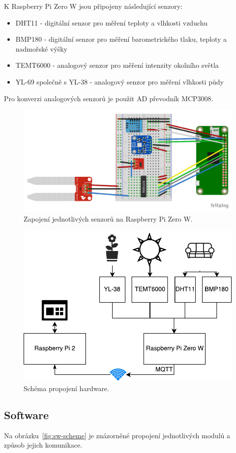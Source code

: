 \documentclass[11pt,a4paper]{article}
\begin{document}
K Raspberry Pi Zero W jsou připojeny následující senzory:

\begin{itemize}
    \item DHT11 - digitální senzor pro měření teploty a vlhkosti vzduchu
    \item BMP180 - digitální senzor pro měření barometrického tlaku, teploty a nadmořské výšky
    \item TEMT6000 - analogový senzor pro měření intenzity okolního světla
    \item YL-69 společně s YL-38 - analogový senzor pro měření vlhkosti půdy
\end{itemize}

Pro konverzi analogových senzorů je použit AD převodník MCP3008.

\begin{figure}[htb]
    \centering
    \includegraphics[width=0.75\linewidth]{weather-station_bb}
    \caption{Zapojení jednotlivých senzorů na Raspberry Pi Zero W.}
    \label{fig:hw-scheme-bb}
\end{figure}

\begin{figure}[htb]
    \centering
    \includegraphics[width=0.5\linewidth]{weather-station-scheme}
    \caption{Schéma propojení hardware.}
    \label{fig:hw-scheme}
\end{figure}

\subsection{Software}\label{subsec:sw}
Na obrázku~\ref{fig:sw-scheme} je znázorněné propojení jednotlivých modulů a způsob jejich komunikace.
\end{document}
